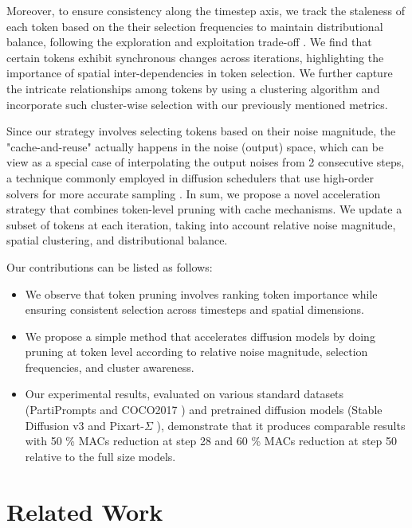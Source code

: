 \documentclass[10pt]{article}
\begin{document}
Moreover, to ensure consistency along the timestep axis, we track the staleness of each token based on the their selection frequencies to maintain distributional balance, following the exploration and exploitation trade-off \citep{Auer2002FinitetimeAO}. We find that  certain tokens exhibit synchronous changes across iterations, highlighting the importance of spatial inter-dependencies in token selection. We further capture the intricate relationships among tokens by using a clustering algorithm \citep{MacQueen1967SomeMF} and incorporate such cluster-wise selection with our previously mentioned metrics.

Since our strategy involves selecting tokens based on their noise magnitude, the "cache-and-reuse" actually happens in the noise (output) space, which can be view as a special case of interpolating the output noises from 2 consecutive steps, a technique commonly employed in diffusion schedulers that use high-order solvers for more accurate sampling \citep{lu2022dpm,zheng2023dpmsolverv3improveddiffusionode}. In sum, we propose a novel acceleration strategy that combines token-level pruning with cache mechanisms. We update a subset of tokens at each iteration, taking into account relative noise magnitude, spatial clustering, and distributional balance.

Our contributions can be listed as follows:

\begin{itemize}
    \item We observe that token pruning involves ranking token importance while ensuring consistent selection across timesteps and spatial dimensions.
    \item We propose a simple method that accelerates diffusion models by doing pruning at token level according to relative noise magnitude, selection frequencies, and cluster awareness.
    \item Our experimental results, evaluated
on various standard datasets (PartiPrompts \citep{yu2022scalingautoregressivemodelscontentrich} and COCO2017 \citep{lin2015microsoftcococommonobjects}) and pretrained diffusion models (Stable Diffusion v3 \citep{esser2024scalingrectifiedflowtransformers} and Pixart-$\Sigma$ \citep{chen2024pixartsigma}), demonstrate that it produces comparable results with 50 \% MACs reduction at step 28 and 60 \% MACs reduction at step 50 relative to the full size models.
\end{itemize}



\section{Related Work}
\end{document}
